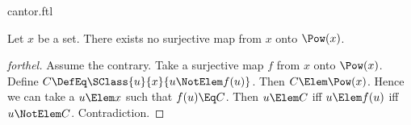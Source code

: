 \documentclass{stex}
\begin{document}
\begin{smodule}{cantor.ftl}



\begin{theorem*}[forthel,title=Cantor's Theorem,name=Cantor I]
  Let $x$ be a set.
  There exists no surjective map from $x$ onto $\Pow(x)$.
\end{theorem*}
\begin{proof}[forthel]
  Assume the contrary.
  Take a surjective map $f$ from $x$ onto $\Pow(x)$.
  Define $C \DefEq \SClass{u}{x}{u \NotElem f(u)}$.
  Then $C \Elem \Pow(x)$.
  Hence we can take a $u \Elem x$ such that $f(u) \Eq C$.
  Then $u \Elem C$ iff $u \Elem f(u)$ iff $u \NotElem C$.
  Contradiction.
\end{proof}

\end{smodule}
\end{document}
